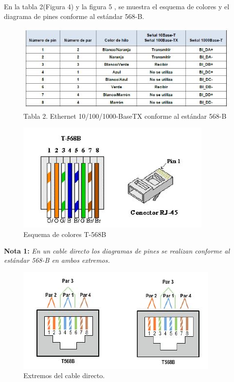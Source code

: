 \documentclass[journal]{IEEEtran}
\begin{document}
En la tabla 2(Figura 4) y la figura 5  , se muestra el esquema de colores y el diagrama de pines conforme al estándar 568-B.
\begin{center}
\begin{figure}[H]
\centering
\includegraphics[scale=0.65]{4.JPG} 
\caption{Tabla 2. Ethernet 10/100/1000-BaseTX conforme al estándar 568-B}
\end{figure}
\end{center}
\begin{center}
\begin{figure}[H]
\centering
\includegraphics[scale=0.75]{5.JPG} 
\caption{Esquema de colores T-568B}
\end{figure}
\end{center}
\textbf{Nota 1:}
\textit{En un cable directo los diagramas de pines se realizan conforme al estándar 568-B en ambos extremos.}\\
\begin{center}
\begin{figure}[H]
\centering
\includegraphics[scale=0.75]{6.JPG} 
\caption{Extremos del cable directo.}
\end{figure}
\end{center}
\end{document}
